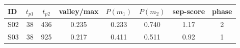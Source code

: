\begin{tabular}{lccccccc}
\toprule
ID & $t_{p1}$ & $t_{p2}$ & valley/max & $P(m_1)$ & $P(m_2)$ & sep-score & phase \\
\midrule
S02 & 38 & 436 & 0.235 & 0.233 & 0.740 & 1.17 & 2 \\
S03 & 38 & 925 & 0.217 & 0.411 & 0.511 & 0.92 & 1 \\
\bottomrule
\end{tabular}
